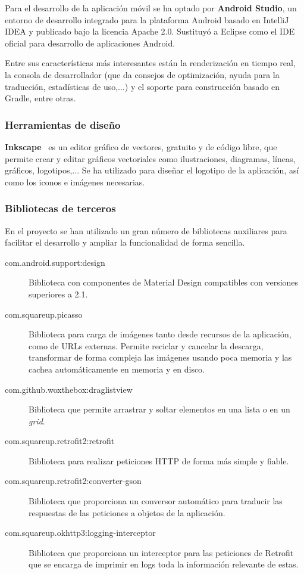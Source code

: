 Para el desarrollo de la aplicación móvil se ha optado por
\textbf{Android Studio},\cite{android-studio} un entorno de desarrollo integrado
para la plataforma Android basado en IntelliJ IDEA y publicado bajo la licencia
Apache 2.0. Sustituyó a Eclipse como el IDE oficial para desarrollo de
aplicaciones Android.

Entre sus características más interesantes están la renderización en tiempo real,
la consola de desarrollador (que da consejos de optimización, ayuda para la
traducción, estadísticas de uso,...) y el soporte para construcción basado en
Gradle, entre otras.


\subsubsection{Herramientas de diseño}

\textbf{Inkscape}~\cite{inkscape} es un editor gráfico de vectores, gratuito y
de código libre, que permite crear y editar gráficos vectoriales como
ilustraciones, diagramas, líneas, gráficos, logotipos,... Se ha utilizado para
diseñar el logotipo de la aplicación, así como los iconos e imágenes necesarias.


\subsubsection{Bibliotecas de terceros}

En el proyecto se han utilizado un gran número de bibliotecas auxiliares para
facilitar el desarrollo y ampliar la funcionalidad de forma sencilla.

\begin{description}
\item[com.android.support:design] Biblioteca con componentes de Material Design
  compatibles con versiones superiores a 2.1.

\item[com.squareup.picasso] Biblioteca para carga de imágenes tanto desde
  recursos de la aplicación, como de URLs externas. Permite reciclar y cancelar
  la descarga, transformar de forma compleja las imágenes usando poca memoria y
  las cachea automáticamente en memoria y en disco.
  
\item[com.github.woxthebox:draglistview] Biblioteca que permite arrastrar y
  soltar elementos en una lista o en un \textit{grid}.
  
\item[com.squareup.retrofit2:retrofit] Biblioteca para realizar peticiones
  HTTP de forma más simple y fiable.

\item[com.squareup.retrofit2:converter-gson] Biblioteca que proporciona un
  conversor automático para traducir las respuestas de las peticiones a objetos
  de la aplicación.
  
\item[com.squareup.okhttp3:logging-interceptor] Biblioteca que proporciona un
  interceptor para las peticiones de Retrofit que se encarga de imprimir en logs
  toda la información relevante de estas.
\end{description}

